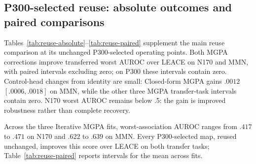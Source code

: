 \subsection{P300-selected reuse: absolute outcomes and paired comparisons}
\label{app:transfer-results}
\label{app:reuse-results}
Tables~\ref{tab:reuse-absolute}--\ref{tab:reuse-paired} supplement the main
reuse comparison at its unchanged P300-selected operating points.
Both MGPA corrections improve
transferred worst AUROC over LEACE on N170 and MMN, with paired intervals
excluding zero; on P300 these intervals contain zero. Control-head changes
from identity are small: Closed-form MGPA gains $.0012$ $[.0006,.0018]$ on
MMN, while the other three MGPA transfer-task intervals contain zero.
N170 worst AUROC remains below .5: the gain is improved robustness rather
than complete recovery.

\begin{table}[htbp]
\centering\small
\caption{\textbf{Absolute reuse outcomes.} A/I/R: aligned/independent/reversed
AUROC of the shortcut-sensitive head; worst/control results are in
Table~\ref{tab:reuse-main}. Iterative entries average fits; other maps are
evaluated once. CORAL/FEATMAP require device identity.}
\label{tab:reuse-absolute}

\end{table}

\begin{table}[htbp]
\centering\small
\caption{\textbf{Paired reuse gains.} Method-minus-comparator AUROC and 95\%
intervals, recomputing worst AUROC inside each bootstrap draw
(Appendix~\ref{app:reuse-protocol}).}
\label{tab:reuse-paired}

\end{table}

Across the three Iterative MGPA fits, worst-association AUROC ranges from
$.417$ to $.471$ on N170 and $.622$ to $.639$ on MMN. Every P300-selected map,
reused unchanged, improves this score over LEACE on both transfer tasks;
Table~\ref{tab:reuse-paired} reports intervals for the mean across fits.
\FloatBarrier
